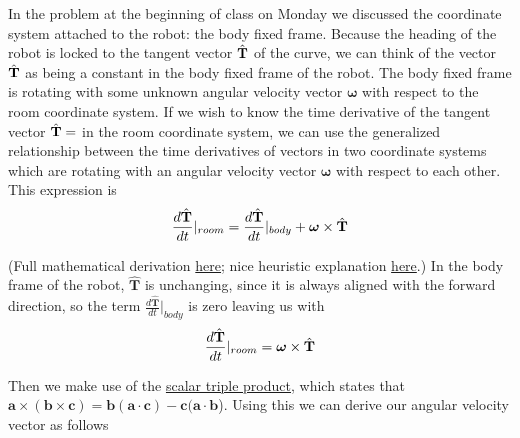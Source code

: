 \documentclass[M3_Night2_Solutions]{subfiles}
\begin{document}
In the problem at the beginning of class on Monday we discussed the coordinate system attached to the robot:  the body fixed frame.  Because the heading of the robot is locked to the tangent vector $\hat{\mathbf{T}}$ of the curve, we can think of the vector $\hat{\mathbf{T}}$ as being a constant in the body fixed frame of the robot.  The body fixed frame is rotating with some unknown angular velocity vector $\boldsymbol \omega$ with respect to the room coordinate system.  If we wish to know the time derivative of the tangent vector $\hat{\mathbf{T}}=$ in the room coordinate system, we can use the generalized relationship between the time derivatives of vectors in two coordinate systems which are rotating with an angular velocity vector $\boldsymbol \omega$ with respect to each other.  This expression is
\begin{equation}
\frac{d\hat{\mathbf{T}}}{dt}|_{room} = \frac{d\hat{\mathbf{T}}}{dt}|_{body} + \boldsymbol \omega \times \hat{\mathbf{T}}
\end{equation}

(Full mathematical derivation \href{http://envsci.rutgers.edu/~broccoli/dynamics_lectures/lect_06_dyn12_mom_eq_rot.pdf}{here}; nice heuristic explanation \href{https://ocw.mit.edu/courses/aeronautics-and-astronautics/16-07-dynamics-fall-2009/lecture-notes/MIT16_07F09_Lec08.pdf}{here}.) In the body frame of the robot, $\hat{\mathbf{T}}$ is unchanging, since it is always aligned with the forward direction, so the term $\frac{d\hat{\mathbf{T}}}{dt}|_{body}$ is zero leaving us with
\begin{equation}
\frac{d\hat{\mathbf{T}}}{dt}|_{room} = \boldsymbol \omega \times \hat{\mathbf{T}}
\end{equation}



Then we make use of the \href{https://en.wikipedia.org/wiki/Triple_product}{scalar triple product}, which states that $\mathbf{a}\times (\mathbf{b}\times \mathbf{c}) = \mathbf{b}(\mathbf{a}\cdot\mathbf{c}) - \mathbf{c}(\mathbf{a}\cdot\mathbf{b}$).  Using this we can derive our angular velocity vector as follows

\end{document}
